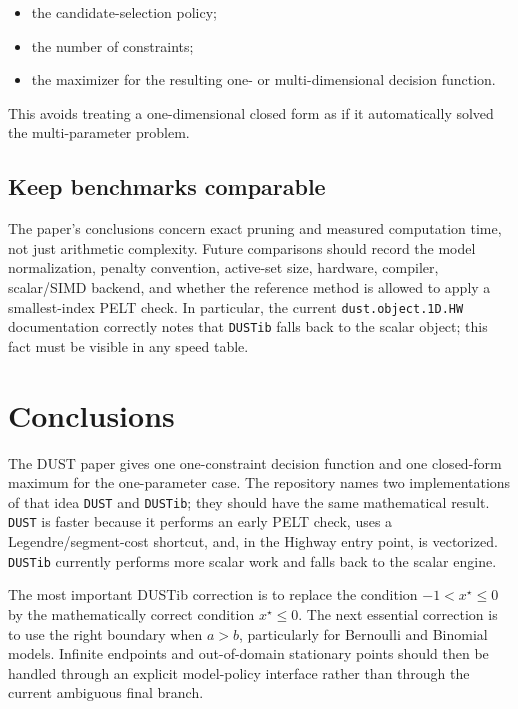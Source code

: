 \documentclass[11pt]{article}
\begin{document}
\begin{itemize}
  \item the candidate-selection policy;
  \item the number of constraints;
  \item the maximizer for the resulting one- or multi-dimensional decision
        function.
\end{itemize}

This avoids treating a one-dimensional closed form as if it automatically
solved the multi-parameter problem.

\subsection{Keep benchmarks comparable}

The paper's conclusions concern exact pruning and measured computation time,
not just arithmetic complexity.  Future comparisons should record the model
normalization, penalty convention, active-set size, hardware, compiler,
scalar/SIMD backend, and whether the reference method is allowed to apply a
smallest-index PELT check.  In particular, the current
\texttt{dust.object.1D.HW} documentation correctly notes that
\texttt{DUSTib} falls back to the scalar object; this fact must be visible in
any speed table.

\section{Conclusions}

The DUST paper gives one one-constraint decision function and one closed-form
maximum for the one-parameter case.  The repository names two implementations
of that idea \texttt{DUST} and \texttt{DUSTib}; they should have the same
mathematical result.  \texttt{DUST} is faster because it performs an early
PELT check, uses a Legendre/segment-cost shortcut, and, in the Highway entry
point, is vectorized.  \texttt{DUSTib} currently performs more scalar work and
falls back to the scalar engine.

The most important DUSTib correction is to replace the condition
$-1<x^\star\leq0$ by the mathematically correct condition $x^\star\leq0$.
The next essential correction is to use the right boundary when $a>b$,
particularly for Bernoulli and Binomial models.  Infinite endpoints and
out-of-domain stationary points should then be handled through an explicit
model-policy interface rather than through the current ambiguous final
branch.
\end{document}
